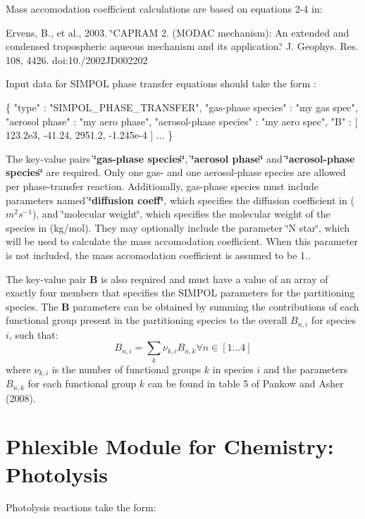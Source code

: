 Mass accomodation coefficient calculations are based on equations 2-\/4 in\+:

Ervens, B., et al., 2003. \char`\"{}\+C\+A\+P\+R\+A\+M 2. (\+M\+O\+D\+A\+C mechanism)\+: An extended
 and condensed tropospheric aqueous mechanism and its application.\char`\"{} J. Geophys. Res. 108, 4426. doi\+:10./2002\+J\+D002202

Input data for S\+I\+M\+P\+OL phase transfer equations should take the form \+: 
\begin{DoxyCode}
\{
  "type" : "SIMPOL\_PHASE\_TRANSFER",
  "gas-phase species" : "my gas spec",
  "aerosol phase" : "my aero phase",
  "aerosol-phase species" : "my aero spec",
  "B" : [ 123.2e3, -41.24, 2951.2, -1.245e-4 ]
    ...
\}
\end{DoxyCode}
 The key-\/value pairs {\bfseries \char`\"{}gas-\/phase species\char`\"{}}, {\bfseries \char`\"{}aerosol phase\char`\"{}} and {\bfseries \char`\"{}aerosol-\/phase species\char`\"{}} are required. Only one gas-\/ and one aerosol-\/phase species are allowed per phase-\/transfer reaction. Additionally, gas-\/phase species must include parameters named {\bfseries \char`\"{}diffusion coeff\char`\"{}}, which specifies the diffusion coefficient in ( $m^2s^{-1}$), and \char`\"{}molecular weight\char`\"{}, which specifies the molecular weight of the species in (kg/mol). They may optionally include the parameter \char`\"{}\+N star\char`\"{}, which will be used to calculate the mass accomodation coefficient. When this parameter is not included, the mass accomodation coefficient is assumed to be 1..

The key-\/value pair {\bfseries B} is also required and must have a value of an array of exactly four members that specifies the S\+I\+M\+P\+OL parameters for the partitioning species. The {\bfseries B} parameters can be obtained by summing the contributions of each functional group present in the partitioning species to the overall $B_{n,i}$ for species $i$, such that\+: \[ B_{n,i} = \sum_{k} \nu_{k,i} B_{n,k} \forall n \in [1...4] \] where $\nu_{k,i}$ is the number of functional groups $k$ in species $i$ and the parameters $B_{n,k}$ for each functional group $k$ can be found in table 5 of Pankow and Asher (2008). \hypertarget{phlex_rxn_photolysis}{}\section{Phlexible Module for Chemistry\+: Photolysis}\label{phlex_rxn_photolysis}
Photolysis reactions take the form\+:

